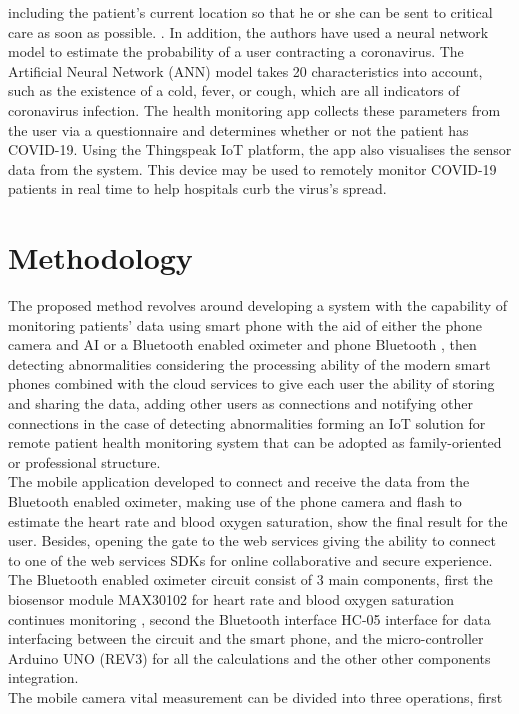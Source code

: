 \documentclass{bmcart}
\begin{document}
including the patient's current location so that he or she can be sent to
critical care as soon as possible. . In addition, the authors have used a neural
network model to estimate the probability of a user contracting a coronavirus.
The Artificial Neural Network (ANN) model takes 20 characteristics into account,
such as the existence of a cold, fever, or cough, which are all indicators of
coronavirus infection. The health monitoring app collects these parameters from
the user via a questionnaire and determines whether or not the patient has
COVID-19. Using the Thingspeak IoT platform, the app also visualises the sensor
data from the system. This device may be used to remotely monitor COVID-19
patients in real time to help hospitals curb the virus's spread.

\section*{Methodology}
The proposed method revolves around developing a system with the capability of
monitoring patients' data using smart phone with the aid of either the phone
camera and AI or a Bluetooth enabled oximeter and phone Bluetooth , then
detecting abnormalities considering the processing ability of the modern smart
phones combined with the cloud services to give each user the ability of storing
and sharing the data, adding other users as connections and notifying other
connections in the case of detecting abnormalities forming an IoT solution for
remote patient health monitoring system that can be adopted as family-oriented
or professional structure.\\
The mobile application developed to connect and receive the data from the
Bluetooth enabled oximeter, making use of the phone camera and flash to estimate
the heart rate and blood oxygen saturation, show the final result for the user.
Besides, opening the gate to the web services giving the ability to connect to
one of the web services SDKs for online collaborative and secure experience.\\
The Bluetooth enabled oximeter circuit consist of 3 main components, first the
biosensor module MAX30102 for heart rate and blood oxygen saturation continues
monitoring \cite{max30102}, second the Bluetooth interface HC-05 interface for
data interfacing between the circuit and the smart phone, and the
micro-controller Arduino UNO (REV3) for all the calculations and the other other
components integration.\\
The mobile camera vital measurement can be divided into three operations, first
\end{document}

